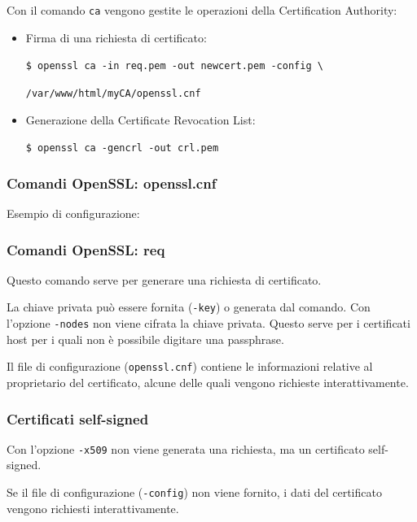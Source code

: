             Con il comando \verb|ca| vengono gestite le operazioni della Certification Authority:
            \begin{itemize}
                \item Firma di una richiesta di certificato:
                
                \verb|$ openssl ca -in req.pem -out newcert.pem -config \|
                
                \verb|/var/www/html/myCA/openssl.cnf|
                \item Generazione della Certificate Revocation List:
                
                \verb|$ openssl ca -gencrl -out crl.pem|
            \end{itemize}

        \subsubsection{Comandi OpenSSL: openssl.cnf}
            Esempio di configurazione:

            

        \subsubsection{Comandi OpenSSL: req}
            Questo comando serve per generare una richiesta di certificato.
        
            La chiave privata può essere fornita (\verb|-key|) o generata dal comando. Con l'opzione \verb|-nodes| non viene cifrata la chiave privata. Questo serve per i certificati host per i quali non è possibile digitare una passphrase.
        
            Il file di configurazione (\verb|openssl.cnf|) contiene le informazioni relative al proprietario del certificato, alcune delle quali vengono richieste interattivamente.
        
            
        
        \subsubsection{Certificati self-signed}
            Con l'opzione \verb|-x509| non viene generata una richiesta, ma un certificato self-signed.
        
            Se il file di configurazione (\verb|-config|) non viene fornito, i dati del certificato vengono richiesti interattivamente.

